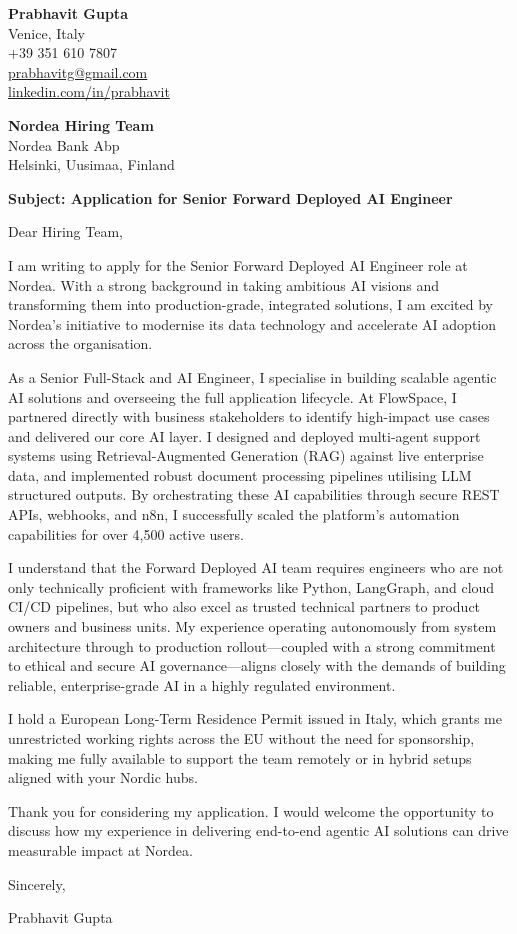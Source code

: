 \documentclass[a4paper,11pt]{article}
\begin{document}
\begin{flushright}
\textbf{Prabhavit Gupta}\\
Venice, Italy\\
+39 351 610 7807\\
\href{mailto:prabhavitg@gmail.com}{prabhavitg@gmail.com}\\
\href{https://www.linkedin.com/in/prabhavit/}{linkedin.com/in/prabhavit}
\end{flushright}

\vspace{2em}

\textbf{Nordea Hiring Team}\\
Nordea Bank Abp\\
Helsinki, Uusimaa, Finland

\vspace{1.5em}

\textbf{Subject: Application for Senior Forward Deployed AI Engineer}

Dear Hiring Team,

I am writing to apply for the Senior Forward Deployed AI Engineer role at Nordea. With a strong background in taking ambitious AI visions and transforming them into production-grade, integrated solutions, I am excited by Nordea's initiative to modernise its data technology and accelerate AI adoption across the organisation. 

As a Senior Full-Stack and AI Engineer, I specialise in building scalable agentic AI solutions and overseeing the full application lifecycle. At FlowSpace, I partnered directly with business stakeholders to identify high-impact use cases and delivered our core AI layer. I designed and deployed multi-agent support systems using Retrieval-Augmented Generation (RAG) against live enterprise data, and implemented robust document processing pipelines utilising LLM structured outputs. By orchestrating these AI capabilities through secure REST APIs, webhooks, and n8n, I successfully scaled the platform's automation capabilities for over 4,500 active users.

I understand that the Forward Deployed AI team requires engineers who are not only technically proficient with frameworks like Python, LangGraph, and cloud CI/CD pipelines, but who also excel as trusted technical partners to product owners and business units. My experience operating autonomously from system architecture through to production rollout—coupled with a strong commitment to ethical and secure AI governance—aligns closely with the demands of building reliable, enterprise-grade AI in a highly regulated environment.

I hold a European Long-Term Residence Permit issued in Italy, which grants me unrestricted working rights across the EU without the need for sponsorship, making me fully available to support the team remotely or in hybrid setups aligned with your Nordic hubs.

Thank you for considering my application. I would welcome the opportunity to discuss how my experience in delivering end-to-end agentic AI solutions can drive measurable impact at Nordea. 

Sincerely,

\vspace{1em}
Prabhavit Gupta
\end{document}
